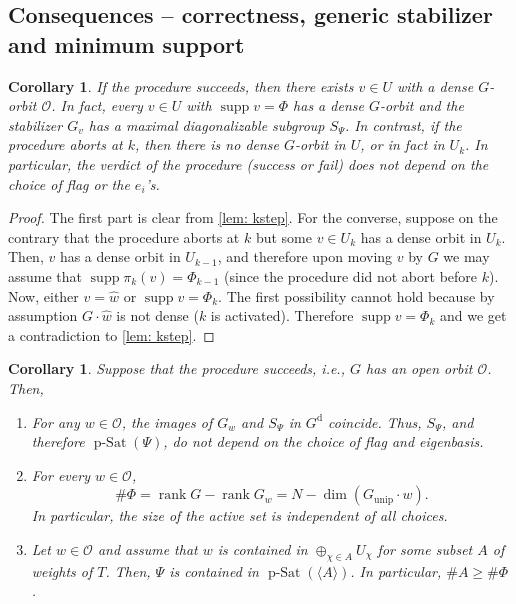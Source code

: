 \documentclass[12pt]{article}
\newtheorem{corollary}[theorem]{Corollary}
\newcommand{\rk}{\operatorname{rank}}
\newcommand{\supp}{\operatorname{supp}}
\newcommand{\rad}[1]{#1_{\operatorname{unip}}}
\newcommand{\orbit}{\mathcal{O}}
\newcommand{\pSat}{\operatorname{p-Sat}}
\newcommand{\diag}{\mathrm{d}}
\begin{document}
\subsection{Consequences -- correctness, generic stabilizer and minimum support}
\begin{corollary} \label{cor: algo}
If the procedure succeeds, then there exists $v\in U$ with a dense $G$-orbit $\orbit$.
In fact, every $v\in U$ with $\supp v=\Phi$ has a dense $G$-orbit and the stabilizer $G_v$ has a maximal diagonalizable subgroup $S_\Psi$.
In contrast, if the procedure aborts at $k$, then there is no dense $G$-orbit in $U$, or in fact in $U_k$.
In particular, the verdict of the procedure (success or fail) does not depend on the choice of flag or the $e_i$'s.
\end{corollary}

\begin{proof}
The first part is clear from \cref{lem: kstep}. For the converse, suppose on the contrary that the procedure aborts at $k$ but some $v\in U_k$ has a dense orbit in $U_k$.
Then, $v$ has a dense orbit in $U_{k-1}$, and therefore upon moving $v$ by $G$ we may assume that $\supp\pi_k(v)=\Phi_{k-1}$ (since the procedure did not abort before $k$).
Now, either $v=\hat w$ or $\supp v=\Phi_k$. The first possibility cannot hold because by assumption $G\cdot\hat w$ is not dense ($k$ is activated).
Therefore $\supp v=\Phi_k$ and we get a contradiction to \cref{lem: kstep}.
\end{proof}


\begin{corollary} \label{cor: independence}
Suppose that the procedure succeeds, i.e., $G$ has an open orbit $\orbit$.
Then,
\begin{enumerate}
\item For any $w\in\orbit$, the images of $G_w$ and $S_\Psi$ in $G^{\diag}$ coincide. Thus, $S_\Psi$, and therefore
$\pSat(\Psi)$, do not depend on the choice of flag and eigenbasis.
\item For every $w\in\orbit$,
\[
\#\Phi=\rk G-\rk G_w=N-\dim(\rad{G}\cdot w).
\]
In particular, the size of the active set is independent of all choices.
\item Let $w\in\orbit$ and assume that $w$ is contained in $\oplus_{\chi\in A} U_\chi$ for some subset $A$ of weights of $T$.
Then, $\Psi$ is contained in $\pSat(\langle A\rangle)$. In particular, $\# A\ge\#\Phi$.
\end{enumerate}
\end{corollary}
\end{document}
